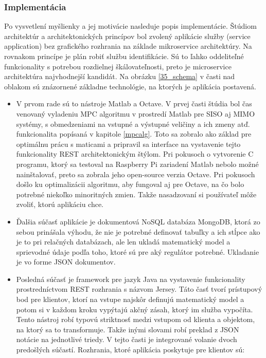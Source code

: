 \subsubsection{Implementácia}
Po vysvetlení myšlienky a jej motivácie nasleduje popis implementácie. Štúdiom architektúr a architektonických princípov bol zvolený aplikácie služby (service application) bez grafického rozhrania na základe mikroservice architektúry. Na rovnakom princípe je plán robiť službu identifikácie. Sú to ľahko oddeliteľné funkcionality s potrebou rozdielnej škálovateľnosti, preto je microservice architektúra najvhodnejší kandidát. Na obrázku \ref{35_schema} v časti nad oblakom sú znázornené základne technológie, na ktorých je aplikácia postavená.
\begin{itemize}
  \item V prvom rade sú to nástroje Matlab a Octave. V prvej časti štúdia bol čas venovaný vyladeniu MPC algoritmu v prostredí Matlab pre SISO aj MIMO systémy, s obmedzeniami na vstupné a výstupné veličiny a ich zmeny atď. funkcionalita popísaná v  kapitole \ref{mpcalg}. Toto sa zobralo ako základ pre optimálnu prácu s maticami a pripravil sa interface na vystavenie tejto funkcionality REST architektonickým štýlom. Pri pokusoch o vytvorenie C programu, ktorý sa testoval na Raspberry Pi zariadení Matlab nebolo možné nainštalovať, preto sa zobrala jeho open-source verzia Octave. Pri pokusoch došlo ku optimalizácii algoritmu, aby fungoval aj pre Octave, na čo bolo potrebné niekoľko minoritných zmien. Takže nasadzovaní si používateľ môže zvoliť, ktorú aplikáciu chce.
  \item Ďalšia súčasť aplikácie je dokumentová NoSQL databáza MongoDB, ktorá zo sebou prinášala výhodu, že nie je potrebné definovať tabuľky a ich stĺpce ako je to pri relačných databázach, ale len ukladá matematický model a sprievodné údaje podľa toho, ktoré sú pre aký regulátor potrebné. Ukladanie je vo forme JSON dokumentov.
  \item Posledná súčasť je framework pre jazyk Java na vystavenie funkcionality prostredníctvom REST rozhrania s názvom Jersey. Táto časť tvorí prístupový bod pre klientov, ktorí na vstupe najskôr definujú matematický model a potom si v každom kroku vypýtajú akčný zásah, ktorý im služba vypočíta. Tento nástroj robí typovú striktnosť medzi vstupom od klienta a objektom, na ktorý sa to transformuje. Takže inými slovami robí preklad z JSON notácie na jednotlivé triedy. V tejto časti je integrované volanie dvoch predošlých súčastí. Rozhrania, ktoré aplikácia poskytuje pre klientov sú:

\end{itemize}
